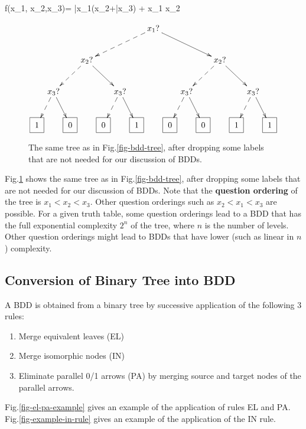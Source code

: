 \beq
f(x_1, x_2,x_3)=
\bar{x}_1(x_2+\bar{x}_3)  + x_1 x_2
\label{eq-bdd-truth-table}
\eeq
\begin{figure}[h!]
$$
\xymatrix@C=.1pc{
&&&&&&&x_1?\ar@{-->}[dllll]
\ar[drrrr]
\\
&&&x_2?\ar@{-->}[dll]\ar[drr]
&&&&&&&&x_2?\ar@{-->}[dll]\ar[drr]
\\
&x_3?\ar@{-->}[dl]\ar[dr]
&&&&x_3?\ar@{-->}[dl]\ar[dr]
&&&&x_3?\ar@{-->}[dl]\ar[dr]
&&&&x_3?\ar@{-->}[dl]\ar[dr]
\\
\Rect{1}
&&\Rect{0}
&&\Rect{0}
&&\Rect{1}
&&\Rect{0}
&&\Rect{0}
&&\Rect{1}
&&\Rect{1}
}
$$
\caption{The same tree as in Fig.\ref{fig-bdd-tree}, after dropping 
some labels that are not needed
for our discussion of BDDs.}
\label{fig-bdd-tree-simp}
\end{figure}


Fig.\ref{fig-bdd-tree-simp} shows
the same tree as in  Fig.\ref{fig-bdd-tree}, after dropping 
some labels that are not needed
for our discussion of BDDs.
Note that the {\bf question ordering} of the tree is
$x_1<x_2<x_3$. Other question
orderings such as $x_2< x_1 < x_3$
are possible. For a given
truth table, some question 
orderings lead to a BDD 
that has the full  
exponential complexity $2^n$
of the tree, where $n$ is 
the number of levels. Other question orderings
might lead to BDDs that have lower (such as linear in $n$) 
complexity.



\subsection{Conversion of Binary Tree into BDD}

A BDD is obtained
from a binary tree by 
successive application of the
following
3 rules:

\begin{enumerate}
\item Merge equivalent leaves (EL)
\item Merge isomorphic nodes (IN)
\item Eliminate parallel 0/1 arrows (PA) by merging source
and target nodes of the parallel  arrows.
\end{enumerate}

Fig.\ref{fig-el-pa-example} 
gives an example
of the application of rules EL and PA.
Fig.\ref{fig-example-in-rule}
gives an example of the 
application of the IN rule.


